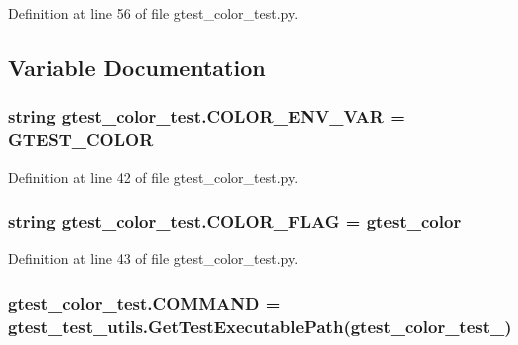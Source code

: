 Definition at line 56 of file gtest\+\_\+color\+\_\+test.\+py.



\subsection{Variable Documentation}
\subsubsection[{\texorpdfstring{C\+O\+L\+O\+R\+\_\+\+E\+N\+V\+\_\+\+V\+AR}{COLOR_ENV_VAR}}]{\setlength{\rightskip}{0pt plus 5cm}string gtest\+\_\+color\+\_\+test.\+C\+O\+L\+O\+R\+\_\+\+E\+N\+V\+\_\+\+V\+AR = \textquotesingle{}G\+T\+E\+S\+T\+\_\+\+C\+O\+L\+OR\textquotesingle{}}\hypertarget{namespacegtest__color__test_aa6deaa7da27bcc115fe666abad13419c}{}\label{namespacegtest__color__test_aa6deaa7da27bcc115fe666abad13419c}


Definition at line 42 of file gtest\+\_\+color\+\_\+test.\+py.

\subsubsection[{\texorpdfstring{C\+O\+L\+O\+R\+\_\+\+F\+L\+AG}{COLOR_FLAG}}]{\setlength{\rightskip}{0pt plus 5cm}string gtest\+\_\+color\+\_\+test.\+C\+O\+L\+O\+R\+\_\+\+F\+L\+AG = \textquotesingle{}gtest\+\_\+color\textquotesingle{}}\hypertarget{namespacegtest__color__test_af5818cea608c0551909fefbeaf0edf20}{}\label{namespacegtest__color__test_af5818cea608c0551909fefbeaf0edf20}


Definition at line 43 of file gtest\+\_\+color\+\_\+test.\+py.

\subsubsection[{\texorpdfstring{C\+O\+M\+M\+A\+ND}{COMMAND}}]{\setlength{\rightskip}{0pt plus 5cm}gtest\+\_\+color\+\_\+test.\+C\+O\+M\+M\+A\+ND = {\bf gtest\+\_\+test\+\_\+utils.\+Get\+Test\+Executable\+Path}(\textquotesingle{}gtest\+\_\+color\+\_\+test\+\_\+\textquotesingle{})}\hypertarget{namespacegtest__color__test_a5b2d1937052a86cc99b722dd0db8e4fc}{}\label{namespacegtest__color__test_a5b2d1937052a86cc99b722dd0db8e4fc}


